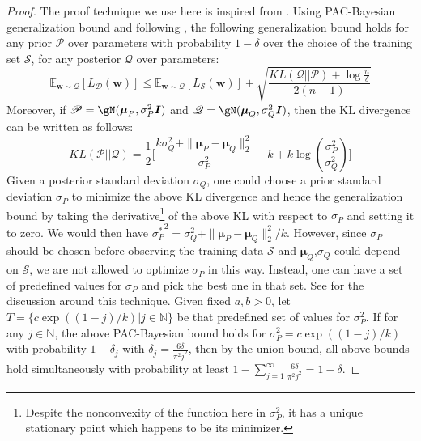 \documentclass{article} %
\begin{document}
\begin{proof}
The proof technique we use here is inspired from \cite{chatterji2019intriguing}. Using PAC-Bayesian generalization bound \cite{mcallester1999pac} and following \cite{dziugaite2017computing}, the following generalization bound holds for any prior $\mathscr{P}$ over parameters with probability $1-\delta$ over the choice of the training set $\mathcal{S}$, for any posterior $\mathscr{Q}$ over parameters:
\begin{equation}
    \mathbb{E}_{\boldsymbol{w}\sim \mathscr{Q}}[L_\mathscr{D}(\boldsymbol{w})] \leq \mathbb{E}_{\boldsymbol{w}\sim \mathscr{Q}}[L_\mathcal{S}(\boldsymbol{w})] +\sqrt{\frac{KL(\mathscr{Q}||\mathscr{P}) + \log \frac{n}{\delta}}{2(n-1)}}
\end{equation}
Moreover, if $\mathscr{P}=\gN(\boldsymbol{\mu}_P,\sigma_P^2 \boldsymbol{I})$ and $\mathscr{Q}=\gN(\boldsymbol{\mu}_Q,\sigma_Q^2 \boldsymbol{I})$, then the KL divergence can be written as follows:
\begin{equation}
    KL(\mathscr{P}||\mathscr{Q}) = \frac{1}{2}\bigg[\frac{k\sigma_Q^2+\|\boldsymbol{\mu}_P-\boldsymbol{\mu}_Q\|_2^2}{\sigma_P^2}- k + k\log\left(\frac{\sigma_P^2}{\sigma_Q^2}\right)\bigg]
\end{equation}
Given a posterior standard deviation $\sigma_Q$, one could choose a prior standard deviation $\sigma_P$ to minimize the above KL divergence and hence the generalization bound by taking the derivative\footnote{Despite the nonconvexity of the function here in $\sigma_P^2$, it has a unique stationary point which happens to be its minimizer.} of the above KL with respect to $\sigma_P$ and setting it to zero. We would then have ${\sigma^*_P}^2=\sigma_Q^2+\|\boldsymbol{\mu}_P-\boldsymbol{\mu}_Q\|_2^2/k$. However, since $\sigma_P$ should be chosen before observing the training data $\mathcal{S}$ and $\boldsymbol{\mu}_Q$,$\sigma_Q$ could depend on $\mathcal{S}$, we are not allowed to optimize $\sigma_P$ in this way. Instead, one can have a set of predefined values for $\sigma_P$ and pick the best one in that set. See \cite{langford2002not} for the discussion around this technique. Given fixed $a,b>0$, let $T=\{c\exp((1-j)/k)| j\in \mathbb{N}\}$ be that predefined set of values for $\sigma_P^2$. If for any $j\in \mathbb{N}$, the above PAC-Bayesian bound holds for $\sigma_P^2=c\exp((1-j)/k)$ with probability $1-\delta_j$ with $\delta_j=\frac{6\delta}{\pi^2j^2}$, then by the union bound, all above bounds hold simultaneously with probability at least $1-\sum_{j=1}^\infty\frac{6\delta}{\pi^2j^2} =1-\delta$.


\end{proof}
\end{document}
